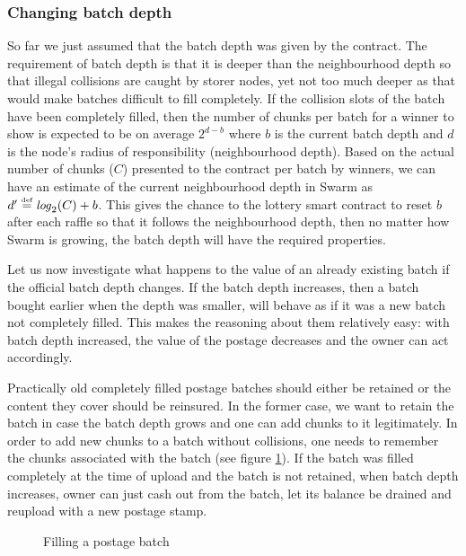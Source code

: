 \subsubsection{Changing batch depth}


So far we just assumed that the batch depth was given by the contract. The requirement of batch depth is that it is deeper than the neighbourhood depth so that illegal collisions are caught by storer nodes, yet not too much deeper as that would make batches difficult to fill completely. If the collision slots of the batch have been completely filled, then the number of chunks per batch for a winner to show is expected to be on average $2^{d-b}$ where $b$ is the current batch depth and $d$ is the node's radius of responsibility (neighbourhood depth). Based on the actual number of chunks ($C$) presented to the contract per batch by winners, we can have an estimate of the current neighbourhood depth in Swarm as $d'\overset{\textrm{\tiny def}}{=}\mathit{log}_2(C)+b$. This gives the chance to the lottery smart contract to reset $b$ after each raffle so that it follows the neighbourhood depth, then no matter how Swarm is growing, the batch depth will have the required properties. 

Let us now investigate  what happens to the value of an already existing batch if the official batch depth changes. If the batch depth increases, then a batch bought earlier when the depth was smaller, will behave as if it was a new batch not completely filled. This makes the reasoning about them relatively easy: with batch depth increased, the value of the postage decreases and the owner can act accordingly.

Practically old completely filled  postage batches should either be retained or the content they cover should be reinsured. In the former case, we want to retain the batch in case the batch depth grows and one can add chunks to it legitimately. In order to add new chunks to a batch without collisions, one needs to remember the chunks associated with the batch (see figure  \ref{fig:filling-a-postage-batch}). If the batch was filled completely at the time of upload and the batch is not retained, when batch depth increases, owner can just cash out from the batch, let its balance be drained and 
reupload with a new postage stamp.



\begin{figure}[htbp]
  \centering
  \caption{Filling a postage batch}
  \label{fig:filling-a-postage-batch}
\end{figure}



